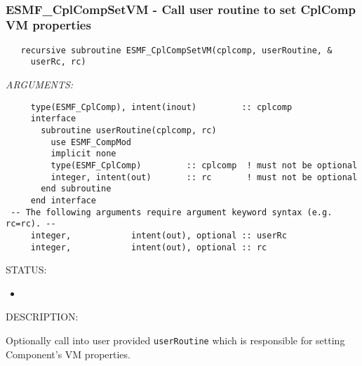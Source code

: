 \mbox{}\hrulefill\ 
 
\subsubsection [ESMF\_CplCompSetVM] {ESMF\_CplCompSetVM - Call user routine to set CplComp VM properties}


  
\begin{verbatim}   recursive subroutine ESMF_CplCompSetVM(cplcomp, userRoutine, &
     userRc, rc)\end{verbatim}{\em ARGUMENTS:}
\begin{verbatim}     type(ESMF_CplComp), intent(inout)         :: cplcomp
     interface
       subroutine userRoutine(cplcomp, rc)
         use ESMF_CompMod
         implicit none
         type(ESMF_CplComp)         :: cplcomp  ! must not be optional
         integer, intent(out)       :: rc       ! must not be optional
       end subroutine
     end interface
 -- The following arguments require argument keyword syntax (e.g. rc=rc). --
     integer,            intent(out), optional :: userRc
     integer,            intent(out), optional :: rc\end{verbatim}
{\sf STATUS:}
   \begin{itemize}
   \item{}
   \end{itemize}
  
{\sf DESCRIPTION:\\ }


   Optionally call into user provided {\tt userRoutine} which is responsible
   for setting Component's VM properties.
  
